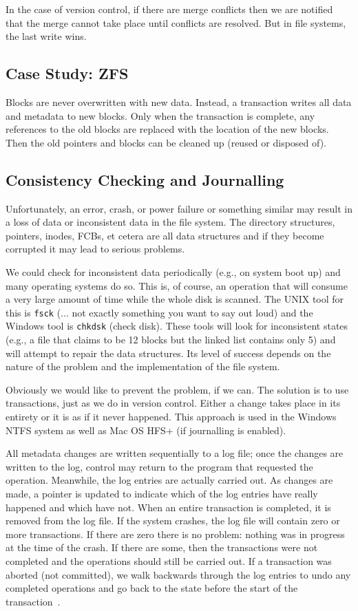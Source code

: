 In the case of version control, if there are merge conflicts then we are notified that the merge cannot take place until conflicts are resolved. But in file systems, the last write wins.

\subsection*{Case Study: ZFS} Blocks are never overwritten with new data. Instead, a transaction writes all data and metadata to new blocks. Only when the transaction is complete, any references to the old blocks are replaced with the location of the new blocks. Then the old pointers and blocks can be cleaned up (reused or disposed of). 


\subsection*{Consistency Checking and Journalling}

Unfortunately, an error, crash, or power failure or something similar may result in a loss of data or inconsistent data in the file system. The directory structures, pointers, inodes, FCBs, et cetera are all data structures and if they become corrupted it may lead to serious problems.

We could check for inconsistent data periodically (e.g., on system boot up) and many operating systems do so. This is, of course, an operation that will consume a very large amount of time while the whole disk is scanned. The UNIX tool for this is \texttt{fsck} (... not exactly something you want to say out loud) and the Windows tool is \texttt{chkdsk} (check disk). These tools will look for inconsistent states (e.g., a file that claims to be 12 blocks but the linked list contains only 5) and will attempt to repair the data structures. Its level of success depends on the nature of the problem and the implementation of the file system.

Obviously we would like to prevent the problem, if we can. The solution is to use transactions, just as we do in version control. Either a change takes place in its entirety or it is as if it never happened. This approach is used in the Windows NTFS system as well as Mac OS HFS+ (if journalling is enabled). 



All metadata changes are written sequentially to a log file; once the changes are written to the log, control may return to the program that requested the operation. Meanwhile, the log entries are actually carried out. As changes are made, a pointer is updated to indicate which of the log entries have really happened and which have not. When an entire transaction is completed, it is removed from the log file. If the system crashes, the log file will contain zero or more transactions. If there are zero there is no problem: nothing was in progress at the time of the crash. If there are some, then the transactions were not completed and the operations should still be carried out. If a transaction was aborted (not committed), we walk backwards through the log entries to undo any completed operations and go back to the state before the start of the transaction~\cite{osc}.

